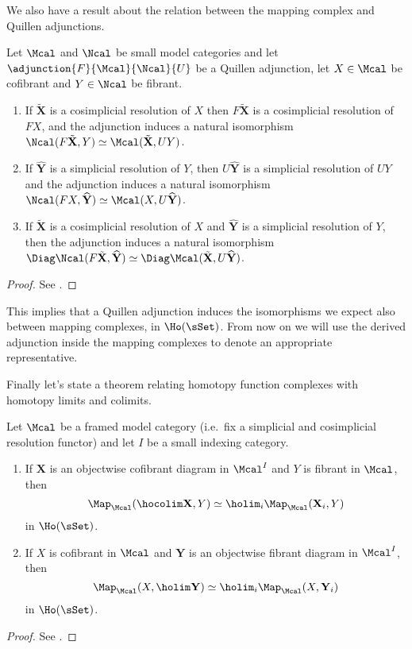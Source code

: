         We also have a result about the relation between the mapping complex and Quillen adjunctions.
        \begin{thm}
            Let $\Mcal$ and $\Ncal$ be small model categories and let $\adjunction{F}{\Mcal}{\Ncal}{U}$ be a Quillen adjunction, let $X \in \Mcal$ be cofibrant and $Y \in \Ncal$ be fibrant. 
            \begin{enumerate}
                \item If $\tilde{\mathbf{X}}$ is a cosimplicial resolution of $X$ then $F\tilde{\mathbf{X}}$ is a cosimplicial resolution of $FX$, and the adjunction induces a natural isomorphism $\Ncal(F\tilde{\mathbf{X}}, Y) \simeq \Mcal(\tilde{\mathbf{X}}, UY)$.
                \item If $\widehat{\mathbf{Y}}$ is a simplicial resolution of $Y$, then $U\widehat{\mathbf{Y}}$ is a simplicial resolution of $UY$ and the adjunction induces a natural isomorphism $\Ncal(FX, \widehat{\mathbf{Y}}) \simeq \Mcal(X, U\widehat{\mathbf{Y}})$.
                \item If $\tilde{\mathbf{X}}$ is a cosimplicial resolution of $X$ and $\widehat{\mathbf{Y}}$ is a simplicial resolution of $Y$, then the adjunction induces a natural isomorphism $\Diag \Ncal(F\tilde{\mathbf{X}}, \widehat{\mathbf{Y}}) \simeq \Diag \Mcal(\tilde{\mathbf{X}}, U\widehat{\mathbf{Y}})$.
            \end{enumerate}
        \end{thm}
        \begin{proof}
            See \cite[Proposition~17.4.16]{Hirs:loc}.
        \end{proof}
        This implies that a Quillen adjunction induces the isomorphisms we expect also between mapping complexes, in $\Ho(\sSet)$. From now on we will use the derived adjunction inside the mapping complexes to denote an appropriate representative.

        Finally let's state a theorem relating homotopy function complexes with homotopy limits and colimits.
        \begin{thm}
            \label{thm:mapping_space_holim_hocolim}
            Let $\Mcal$ be a framed model category (i.e.\ fix a simplicial and cosimplicial resolution functor) and let $I$ be a small indexing category.
            \begin{enumerate}
                \item If $\mathbf{X}$ is an objectwise cofibrant diagram in $\Mcal^I$ and $Y$ is fibrant in $\Mcal$, then \[\Map_{\Mcal}(\hocolim \mathbf{X}, Y) \simeq \holim_i \Map_{\Mcal}(\mathbf{X}_i, Y)\] in $\Ho(\sSet)$.
                \item If $X$ is cofibrant in $\Mcal$ and $\mathbf{Y}$ is an objectwise fibrant diagram in $\Mcal^I$, then \[\Map_{\Mcal}(X, \holim \mathbf{Y}) \simeq \holim_i \Map_{\Mcal}(X, \mathbf{Y}_i) \] in $\Ho(\sSet)$.
            \end{enumerate}
        \end{thm}
        \begin{proof}
            See \cite[Theorem~19.4.4]{Hirs:loc}.
        \end{proof}
